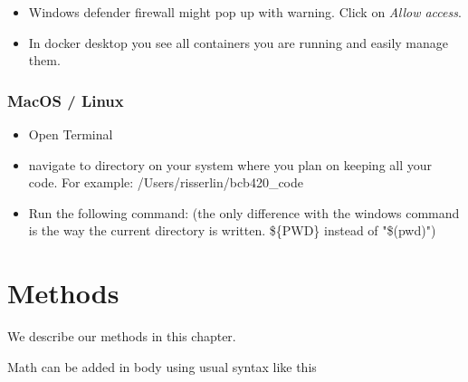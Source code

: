 \documentclass[
]{book}
\newenvironment{Shaded}{\begin{snugshade}}{\end{snugshade}}
\newcommand{\DecValTok}[1]{\textcolor[rgb]{0.00,0.00,0.81}{#1}}
\newcommand{\ErrorTok}[1]{\textcolor[rgb]{0.64,0.00,0.00}{\textbf{#1}}}
\newcommand{\NormalTok}[1]{#1}
\newcommand{\OtherTok}[1]{\textcolor[rgb]{0.56,0.35,0.01}{#1}}
\newcommand{\SpecialCharTok}[1]{\textcolor[rgb]{0.00,0.00,0.00}{#1}}
\newcommand{\StringTok}[1]{\textcolor[rgb]{0.31,0.60,0.02}{#1}}
\providecommand{\tightlist}{%
  \setlength{\itemsep}{0pt}\setlength{\parskip}{0pt}}
\begin{document}
\begin{itemize}
\tightlist
\item
  Windows defender firewall might pop up with warning. Click on \emph{Allow access}.
\item
  In docker desktop you see all containers you are running and easily manage them.
\end{itemize}

\hypertarget{macos-linux}{%
\subsection{MacOS / Linux}\label{macos-linux}}

\begin{itemize}
\tightlist
\item
  Open Terminal
\item
  navigate to directory on your system where you plan on keeping all your code. For example: /Users/risserlin/bcb420\_code
\item
  Run the following command: (the only difference with the windows command is the way the current directory is written. \$\{PWD\} instead of "\$(pwd)")
\end{itemize}

\begin{Shaded}
\end{Shaded}

\hypertarget{methods}{%
\chapter{Methods}\label{methods}}

We describe our methods in this chapter.

Math can be added in body using usual syntax like this
\end{document}
